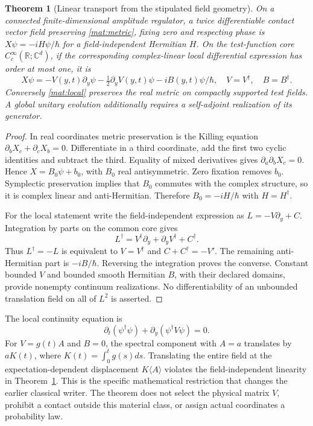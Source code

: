 \documentclass[11pt,oneside,openany]{book}
\newtheorem{theorem}{Theorem}[chapter]
\theoremstyle{definition}
\theoremstyle{remark}\newtheorem{remark}[theorem]{Remark}
\begin{document}
\begin{theorem}[Linear transport from the stipulated field geometry]
\label{mat:linear}
On a connected finite-dimensional amplitude regulator, a twice differentiable contact vector field preserving \eqref{mat:metric}, fixing zero and respecting phase is $X\psi=-iH\psi/\hbar$ for a field-independent Hermitian $H$. On the test-function core $C_c^\infty(\mathbb R;\mathbb C^d)$, if the corresponding complex-linear local differential expression has order at most one, it is
\begin{equation}
 X\psi=-V(y,t)\partial_y\psi-\tfrac12\partial_yV(y,t)\psi
               -iB(y,t)\psi/\hbar,
 \quad V=V^\dagger,\quad B=B^\dagger.
 \label{mat:local}
\end{equation}
Conversely \eqref{mat:local} preserves the real metric on compactly supported test fields. A global unitary evolution additionally requires a self-adjoint realization of its generator.
\end{theorem}
\begin{proof}
In real coordinates metric preservation is the Killing equation
$\partial_bX_c+\partial_cX_b=0$. Differentiate in a third coordinate, add the first two cyclic identities and subtract the third. Equality of mixed derivatives gives $\partial_a\partial_bX_c=0$. Hence $X=B_0\psi+b_0$, with $B_0$ real antisymmetric. Zero fixation removes $b_0$. Symplectic preservation implies that $B_0$ commutes with the complex structure, so it is complex linear and anti-Hermitian. Therefore $B_0=-iH/\hbar$ with $H=H^\dagger$.

For the local statement write the field-independent expression as $L=-V\partial_y+C$. Integration by parts on the common core gives
\[
 L^\dagger=V^\dagger\partial_y+\partial_yV^\dagger+C^\dagger.
\]
Thus $L^\dagger=-L$ is equivalent to $V=V^\dagger$ and $C+C^\dagger=-V'$. The remaining anti-Hermitian part is $-iB/\hbar$. Reversing the integration proves the converse. Constant bounded $V$ and bounded smooth Hermitian $B$, with their declared domains, provide nonempty continuum realizations. No differentiability of an unbounded translation field on all of $L^2$ is asserted.
\end{proof}

The local continuity equation is
\begin{equation}
 \partial_t(\psi^\dagger\psi)+\partial_y(\psi^\dagger V\psi)=0.
 \label{mat:continuity}
\end{equation}
For $V=g(t)A$ and $B=0$, the spectral component with $A=a$ translates by $aK(t)$, where $K(t)=\int_0^tg(s)ds$. Translating the entire field at the expectation-dependent displacement $K\langle A\rangle$ violates the field-independent linearity in Theorem~\ref{mat:linear}. This is the specific mathematical restriction that changes the earlier classical writer. The theorem does not select the physical matrix $V$, prohibit a contact outside this material class, or assign actual coordinates a probability law.
\end{document}
